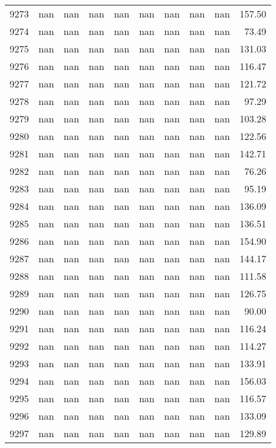 \begin{tabular}{lrrrrrrrrr}
9273 & nan & nan & nan & nan & nan & nan & nan & nan & 157.50 \\
9274 & nan & nan & nan & nan & nan & nan & nan & nan & 73.49 \\
9275 & nan & nan & nan & nan & nan & nan & nan & nan & 131.03 \\
9276 & nan & nan & nan & nan & nan & nan & nan & nan & 116.47 \\
9277 & nan & nan & nan & nan & nan & nan & nan & nan & 121.72 \\
9278 & nan & nan & nan & nan & nan & nan & nan & nan & 97.29 \\
9279 & nan & nan & nan & nan & nan & nan & nan & nan & 103.28 \\
9280 & nan & nan & nan & nan & nan & nan & nan & nan & 122.56 \\
9281 & nan & nan & nan & nan & nan & nan & nan & nan & 142.71 \\
9282 & nan & nan & nan & nan & nan & nan & nan & nan & 76.26 \\
9283 & nan & nan & nan & nan & nan & nan & nan & nan & 95.19 \\
9284 & nan & nan & nan & nan & nan & nan & nan & nan & 136.09 \\
9285 & nan & nan & nan & nan & nan & nan & nan & nan & 136.51 \\
9286 & nan & nan & nan & nan & nan & nan & nan & nan & 154.90 \\
9287 & nan & nan & nan & nan & nan & nan & nan & nan & 144.17 \\
9288 & nan & nan & nan & nan & nan & nan & nan & nan & 111.58 \\
9289 & nan & nan & nan & nan & nan & nan & nan & nan & 126.75 \\
9290 & nan & nan & nan & nan & nan & nan & nan & nan & 90.00 \\
9291 & nan & nan & nan & nan & nan & nan & nan & nan & 116.24 \\
9292 & nan & nan & nan & nan & nan & nan & nan & nan & 114.27 \\
9293 & nan & nan & nan & nan & nan & nan & nan & nan & 133.91 \\
9294 & nan & nan & nan & nan & nan & nan & nan & nan & 156.03 \\
9295 & nan & nan & nan & nan & nan & nan & nan & nan & 116.57 \\
9296 & nan & nan & nan & nan & nan & nan & nan & nan & 133.09 \\
9297 & nan & nan & nan & nan & nan & nan & nan & nan & 129.89 \\

\end{tabular}
